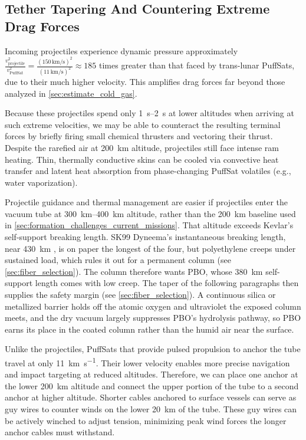 \documentclass{article}
\begin{document}
\subsection{Tether Tapering And Countering Extreme Drag Forces}\label{sec:tether_tapering}

Incoming projectiles experience dynamic pressure approximately  $\frac{v_{\text{projectile}}^2}{v_{\text{PuffSat}}^2} = \frac{(150\,\text{km/s})^2}{(11\,\text{km/s})^2} \approx 185$ times greater than that faced by trans-lunar PuffSats, due to their much higher velocity. This amplifies drag forces far beyond those analyzed in \autoref{sec:estimate_cold_gas}.

Because these projectiles spend only \SIrange{1}{2}{\second} at lower altitudes when arriving at such extreme velocities, we may be able to counteract the resulting terminal forces by briefly firing small chemical thrusters and vectoring their thrust. Despite the rarefied air at \SI{200}{\kilo\meter} altitude, projectiles still face intense ram heating. Thin, thermally conductive skins can be cooled via convective heat transfer and latent heat absorption from phase-changing PuffSat volatiles (e.g., water vaporization).

Projectile guidance and thermal management are easier if projectiles enter the vacuum tube at \SIrange{300}{400}{\kilo\meter} altitude, rather than the \SI{200}{\kilo\meter} baseline used in \autoref{sec:formation_challenges_current_missions}. That altitude exceeds Kevlar's self-support breaking length. SK99 Dyneema's instantaneous breaking length, near \SI{430}{\kilo\meter} \cite{dyneema_sk99_datasheet}, is on paper the longest of the four, but polyethylene creeps under sustained load, which rules it out for a permanent column (see \autoref{sec:fiber_selection}). The column therefore wants PBO, whose \SI{380}{\kilo\meter} self-support length \cite{zylon_technical_info} comes with low creep. The taper of the following paragraphs then supplies the safety margin (see \autoref{sec:fiber_selection}). A continuous silica or metallized barrier holds off the atomic oxygen and ultraviolet the exposed column meets, and the dry vacuum largely suppresses PBO's hydrolysis pathway, so PBO earns its place in the coated column rather than the humid air near the surface.

Unlike the projectiles, PuffSats that provide pulsed propulsion to anchor the tube travel at only \SI{11}{\kilo\meter\per\second}. Their lower velocity enables more precise navigation and impact targeting at reduced altitudes. Therefore, we can place one anchor at the lower \SI{200}{\kilo\meter} altitude and connect the upper portion of the tube to a second anchor at higher altitude. Shorter cables anchored to surface vessels can serve as guy wires to counter winds on the lower \SI{20}{\kilo\meter} of the tube. These guy wires can be actively winched to adjust tension, minimizing peak wind forces the longer anchor cables must withstand.
\end{document}
